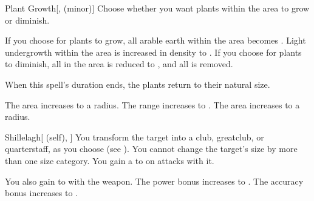 \lowercase{\hypertarget{spell:Plant Growth}{}}\label{spell:Plant Growth}
\begin{freeability}[Rank 1]{\hypertarget{spell:Plant Growth}{Plant Growth}}[,  (minor)]
Choose whether you want plants within the area to grow or diminish.

If you choose for plants to grow, all arable earth within the area becomes .
Light undergrowth within the area is increased in density to .
If you choose for plants to diminish, all  in the area is reduced to , and all  is removed.

When this spell's duration ends, the plants return to their natural size.

\rankline
{} The area increases to a \arealarge radius.
 The range increases to \rnglong.
 The area increases to a \areahuge radius.
\end{freeability}
\vspace{0.25em}



\lowercase{\hypertarget{spell:Shillelagh}{}}\label{spell:Shillelagh}
\begin{attuneability}[Rank 1]{\hypertarget{spell:Shillelagh}{Shillelagh}}[ (self), ]
You transform the target into a club, greatclub, or quarterstaff, as you choose (see ).
You cannot change the target's size by more than one size category.
You gain a   to  on attacks with it.

\rankline
{} You also gain   to  with the weapon.
 The power bonus increases to .
 The accuracy bonus increases to .
\end{attuneability}
\vspace{0.25em}



